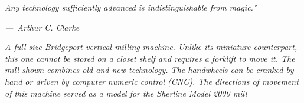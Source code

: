 \bigskip
\textit{Any technology sufficiently advanced is indistinguishable from magic."}

\textit{---\ Arthur C. Clarke}

\bigskip
\textit{A full size Bridgeport vertical milling machine. Unlike its miniature
counterpart, this one cannot be stored on a closet shelf and requires a forklift
to move it. The mill shown combines old and new technology. The handwheels can
be cranked by hand or driven by computer numeric control (CNC). The directions
of movement of this machine served as a model for the Sherline Model 2000 mill}

\secup

\secup

